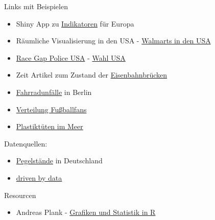 \documentclass[ignorenonframetext,]{beamer}
\providecommand{\tightlist}{%
  \setlength{\itemsep}{0pt}\setlength{\parskip}{0pt}}
\begin{document}
\begin{frame}{Links mit Beispielen}

\begin{itemize}
\item
  Shiny App zu
  \href{https://japhilko.shinyapps.io/Choropleths/}{Indikatoren} für
  Europa
\item
  Räumliche Visualisierung in den USA -
  \href{https://rpubs.com/Radcliffe/walmart}{Walmarts in den USA}
\item
  \href{http://www.nytimes.com/interactive/2014/09/03/us/the-race-gap-in-americas-police-departments.html?_r=0}{Race
  Gap Police USA} - \href{http://fivethirtyeight.com/}{Wahl USA}
\item
  Zeit Artikel zum Zustand der
  \href{http://detektor.fm/digital/datenjournalismus-interaktive-karte-zeigt-marode-deutsche-bahn-bruecken}{Eisenbahnbrücken}
\item
  \href{http://michael-hoerz.de/maps/berlin-bike/}{Fahrradunfälle} in
  Berlin
\item
  \href{http://interaktiv.morgenpost.de/beta-fussballkarte/\#7/51.258/10.756}{Verteilung
  Fußballfans}
\item
  \href{http://news.nationalgeographic.com/news/2014/07/140715-ocean-plastic-debris-trash-pacific-garbage-patch/}{Plastiktüten
  im Meer}
\end{itemize}

Datenquellen:

\begin{itemize}
\tightlist
\item
  \href{https://www.pegelonline.wsv.de/gast/start}{Pegelstände} in
  Deutschland
\item
  \href{http://driven-by-data.net/}{driven by data}
\end{itemize}

Resourcen

\begin{itemize}
\tightlist
\item
  Andreas Plank -
  \href{http://www.chironomidaeproject.com/fileadmin/downloads/Formeln_in_R.pdf}{Grafiken
  und Statistik in R}
\end{itemize}

\end{frame}
\end{document}
